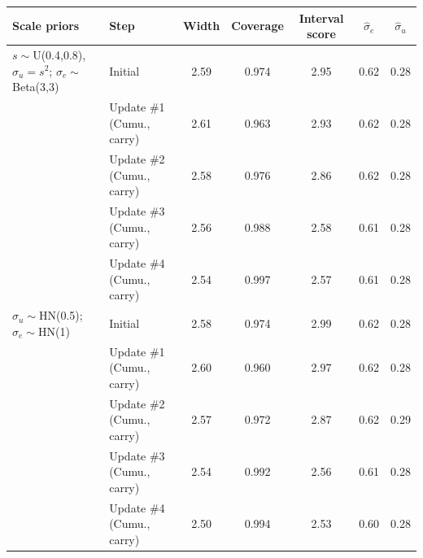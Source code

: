 \begin{tabular}{l l ccccc}
\hline
Scale priors & Step & Width & Coverage & Interval score & $\hat\sigma_e$ & $\hat\sigma_u$ \\
\hline
$s\sim$U(0.4,0.8), $\sigma_u=s^2$; $\sigma_e\sim$Beta(3,3) & Initial & 2.59 & 0.974 & 2.95 & 0.62 & 0.28 \\
 & Update \#1 (Cumu., carry) & 2.61 & 0.963 & 2.93 & 0.62 & 0.28 \\
 & Update \#2 (Cumu., carry) & 2.58 & 0.976 & 2.86 & 0.62 & 0.28 \\
 & Update \#3 (Cumu., carry) & 2.56 & 0.988 & 2.58 & 0.61 & 0.28 \\
 & Update \#4 (Cumu., carry) & 2.54 & 0.997 & 2.57 & 0.61 & 0.28 \\
\hline
$\sigma_u\sim$HN(0.5); $\sigma_e\sim$HN(1) & Initial & 2.58 & 0.974 & 2.99 & 0.62 & 0.28 \\
 & Update \#1 (Cumu., carry) & 2.60 & 0.960 & 2.97 & 0.62 & 0.28 \\
 & Update \#2 (Cumu., carry) & 2.57 & 0.972 & 2.87 & 0.62 & 0.29 \\
 & Update \#3 (Cumu., carry) & 2.54 & 0.992 & 2.56 & 0.61 & 0.28 \\
 & Update \#4 (Cumu., carry) & 2.50 & 0.994 & 2.53 & 0.60 & 0.28 \\
\hline
\end{tabular}